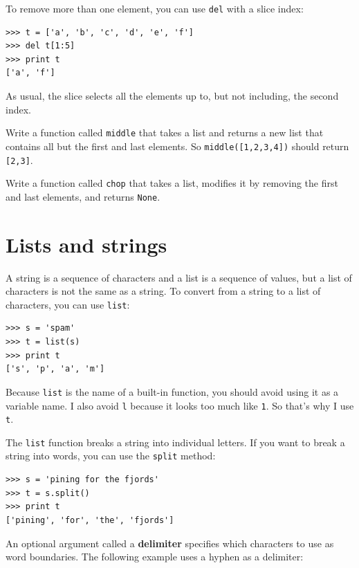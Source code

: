 \documentclass[10pt]{book}
\begin{document}
\begin{CJK}{UTF8}{gbsn}
To remove more than one element, you can use {\tt del} with
a slice index:

\begin{verbatim}
>>> t = ['a', 'b', 'c', 'd', 'e', 'f']
>>> del t[1:5]
>>> print t
['a', 'f']
\end{verbatim}
%
As usual, the slice selects all the elements up to, but not
including, the second index.

\begin{exercise}

Write a function called \verb"middle" that takes a list and
returns a new list that contains all but the first and last
elements.  So \verb"middle([1,2,3,4])" should return \verb"[2,3]".

\end{exercise}

\begin{exercise}

Write a function called \verb"chop" that takes a list, modifies it
by removing the first and last elements, and returns {\tt None}.

\end{exercise}


\section{Lists and strings}

A string is a sequence of characters and a list is a sequence
of values, but a list of characters is not the same as a
string.  To convert from a string to a list of characters,
you can use {\tt list}:

\begin{verbatim}
>>> s = 'spam'
>>> t = list(s)
>>> print t
['s', 'p', 'a', 'm']
\end{verbatim}
%
Because {\tt list} is the name of a built-in function, you should
avoid using it as a variable name.  I also avoid {\tt l} because
it looks too much like {\tt 1}.  So that's why I use {\tt t}.

The {\tt list} function breaks a string into individual letters.  If
you want to break a string into words, you can use the {\tt split}
method:

\begin{verbatim}
>>> s = 'pining for the fjords'
>>> t = s.split()
>>> print t
['pining', 'for', 'the', 'fjords']
\end{verbatim}
%
An optional argument called a {\bf delimiter} specifies which
characters to use as word boundaries.
The following example
uses a hyphen as a delimiter:


\end{CJK}
\end{document}
